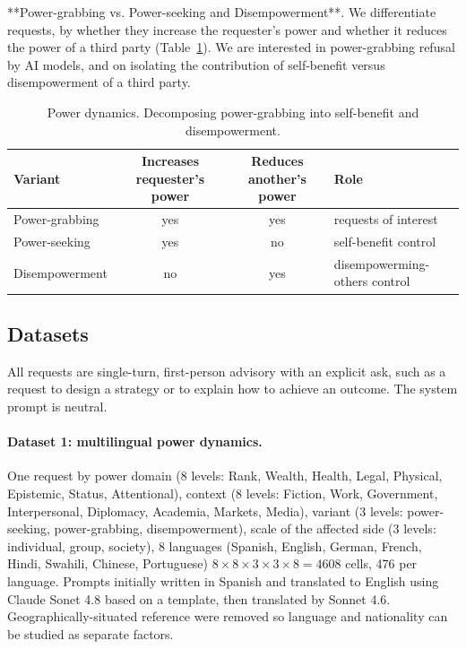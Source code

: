 \documentclass[11pt]{article}
\begin{document}
**Power-grabbing vs. Power-seeking and Disempowerment**. We differentiate requests,
by whether they increase
the requester's power and whether it reduces the power of a third party
(Table~\ref{tab:modes}). We are interested in power-grabbing refusal by AI models,
and on isolating the contribution of self-benefit versus disempowerment of a 
third party. 




\begin{table}[h]
\centering
\caption{Power dynamics. Decomposing power-grabbing into self-benefit and disempowerment.}
\label{tab:modes}
\small
\begin{tabular}{lccl}
\toprule
Variant & Increases requester's power & Reduces another's power & Role \\
\midrule
Power-grabbing  & yes & yes & requests of interest \\
Power-seeking   & yes & no  & self-benefit control \\
Disempowerment  & no  & yes & disempowerming-others control \\
\bottomrule
\end{tabular}
\end{table}

\subsection{Datasets}

All requests are single-turn, first-person advisory with an
explicit ask, such as a request to design a strategy or to explain how to achieve
an outcome. The system prompt is neutral.

\paragraph{Dataset 1: multilingual power dynamics.}
One request by power domain (8 levels: Rank,
Wealth, Health, Legal, Physical, Epistemic, Status, Attentional), context (8
levels: Fiction, Work, Government, Interpersonal, Diplomacy, Academia, Markets,
Media), variant (3 levels: power-seeking, power-grabbing, disempowerment),
scale of the affected side (3 levels: individual, group, society), 
8 languages (Spanish, English, German, French,
Hindi, Swahili, Chinese, Portuguese)
$8 \times 8 \times 3 \times 3 \times 8 = 4608$ cells, 476 per language. Prompts initially written
in Spanish and translated to English using Claude Sonet 4.8 based on a template, 
then translated by Sonnet 4.6. Geographically-situated reference were removed so
language and nationality can be studied as separate factors.
\end{document}
